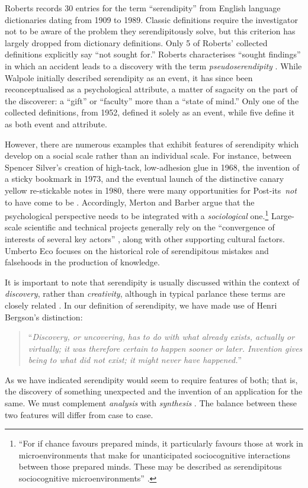 Roberts \citeyear[pp. 246--249]{roberts} records 30 entries for the term ``serendipity'' from English language dictionaries dating from 1909 to 1989.  
%
Classic definitions require the investigator not to be aware of the problem they serendipitously solve, but this criterion has largely dropped from dictionary definitions. Only 5 of Roberts' collected definitions explicitly say ``not sought for.''  Roberts characterises ``sought findings'' in which an accident leads to a discovery with the term \emph{pseudoserendipity} \cite{chumaceiro1995serendipity}.
%
While Walpole initially described serendipity as an event, it has
since been reconceptualised as a psychological attribute, a matter of
sagacity on the part of the discoverer: a ``gift'' or ``faculty'' more
than a ``state of mind.''  Only one of the collected definitions, from
1952, defined it solely as an event, while five define it as both
event and attribute.

However, there are numerous examples that exhibit features of
serendipity which develop on a social scale rather than an individual
scale.  For instance, between Spencer Silver's creation of high-tack,
low-adhesion glue in 1968, the invention of a sticky bookmark in 1973,
and the eventual launch of the distinctive canary yellow re-stickable
notes in 1980, there were many opportunities for
Post-its\texttrademark\ \emph{not} to have come to be
\cite{tce-postits}. Accordingly, Merton and Barber argue that the
psychological perspective needs to be integrated with a
\emph{sociological} one.\footnote{ ``For if chance favours prepared
  minds, it particularly favours those at work in microenvironments
  that make for unanticipated sociocognitive interactions between
  those prepared minds. These may be described as serendipitous
  sociocognitive microenvironments'' \cite[p. 259--260]{merton}.}
Large-scale scientific and technical projects generally rely on the
``convergence of interests of several key actors''
\cite{companions-in-geography}, along with other supporting cultural
factors.  Umberto Eco \citeyear{eco2013serendipities} focuses on the
historical role of serendipitous mistakes and falsehoods in the
production of knowledge.

It is important to note that serendipity is usually discussed within
the context of \emph{discovery}, rather than \emph{creativity},
although in typical parlance these terms are closely related
\cite{jordanous12jims}.  In our definition of serendipity, we have
made use of Henri Bergson's distinction:
\begin{quote}
``\emph{Discovery, or uncovering, has to do with what already exists,
    actually or virtually; it was therefore certain to happen sooner
    or later.  Invention gives being to what did not exist; it might
    never have happened.}''~\cite{bergson2010creative}
\end{quote}
As we have indicated serendipity would seem to require features of
both; that is, the discovery of something unexpected and the invention
of an application for the same.  We must complement \emph{analysis}
with \emph{synthesis} \cite{delanda1993virtual}.  The balance between
these two features will differ from case to case.

